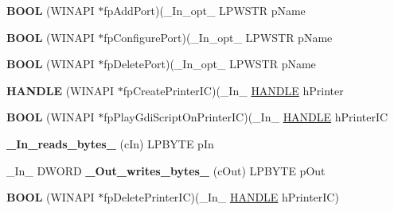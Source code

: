 \begin{DoxyCompactItemize}
{\bfseries B\+O\+OL} (W\+I\+N\+A\+PI $\ast$fp\+Add\+Port)(\+\_\+\+In\+\_\+opt\+\_\+ L\+P\+W\+S\+TR p\+Name
\item 
\mbox{\label{struct___p_r_i_n_t_p_r_o_v_i_d_o_r_a38e05ed5b3a0bd90322c95018c533db9}} 
{\bfseries B\+O\+OL} (W\+I\+N\+A\+PI $\ast$fp\+Configure\+Port)(\+\_\+\+In\+\_\+opt\+\_\+ L\+P\+W\+S\+TR p\+Name
\item 
\mbox{\label{struct___p_r_i_n_t_p_r_o_v_i_d_o_r_abeb2c86298e043346b1aa59f1b4968d7}} 
{\bfseries B\+O\+OL} (W\+I\+N\+A\+PI $\ast$fp\+Delete\+Port)(\+\_\+\+In\+\_\+opt\+\_\+ L\+P\+W\+S\+TR p\+Name
\item 
\mbox{\label{struct___p_r_i_n_t_p_r_o_v_i_d_o_r_addbf4e536e40ff430ad360a2ced05d87}} 
{\bfseries H\+A\+N\+D\+LE} (W\+I\+N\+A\+PI $\ast$fp\+Create\+Printer\+IC)(\+\_\+\+In\+\_\+ \hyperlink{interfacevoid}{H\+A\+N\+D\+LE} h\+Printer
\item 
\mbox{\label{struct___p_r_i_n_t_p_r_o_v_i_d_o_r_a239f5c2c3138bba1332ff1322df7559b}} 
{\bfseries B\+O\+OL} (W\+I\+N\+A\+PI $\ast$fp\+Play\+Gdi\+Script\+On\+Printer\+IC)(\+\_\+\+In\+\_\+ \hyperlink{interfacevoid}{H\+A\+N\+D\+LE} h\+Printer\+IC
\item 
\mbox{\label{struct___p_r_i_n_t_p_r_o_v_i_d_o_r_ab1d9cde89f7fed14353f5c446ba12463}} 
{\bfseries \+\_\+\+In\+\_\+reads\+\_\+bytes\+\_\+} (c\+In) L\+P\+B\+Y\+TE p\+In
\item 
\mbox{\label{struct___p_r_i_n_t_p_r_o_v_i_d_o_r_a8d6520aae5c4a7f0ae2a50262a62de9d}} 
\+\_\+\+In\+\_\+ D\+W\+O\+RD {\bfseries \+\_\+\+Out\+\_\+writes\+\_\+bytes\+\_\+} (c\+Out) L\+P\+B\+Y\+TE p\+Out
\item 
\mbox{\label{struct___p_r_i_n_t_p_r_o_v_i_d_o_r_a212e7cfd795277765218fbdbbc4f1c80}} 
{\bfseries B\+O\+OL} (W\+I\+N\+A\+PI $\ast$fp\+Delete\+Printer\+IC)(\+\_\+\+In\+\_\+ \hyperlink{interfacevoid}{H\+A\+N\+D\+LE} h\+Printer\+IC)
\item 
\mbox{\label{struct___p_r_i_n_t_p_r_o_v_i_d_o_r_a62ef73511368531568e569622ee04750}} 

\end{DoxyCompactItemize}
